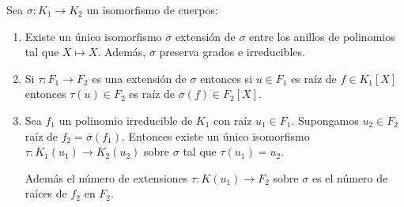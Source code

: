 \begin{proposition}\label{herramientas}
	Sea $\sigma:K_1 \to K_2$ un isomorfismo de cuerpos:
	
	\begin{enumerate}
		\item Existe un único isomorfismo $\overline{\sigma}$ extensión de $\sigma$ entre los anillos de polinomios tal que $X \mapsto X$. Además, $\overline{\sigma}$ preserva grados e irreducibles.  
		\item Si $\tau:F_1 \to F_2$ es una extensión de $\sigma$ entonces si $u \in F_1$ es raíz de $f \in K_1[X]$ entonces $\tau(u) \in F_2$ es raíz de $\overline{\sigma}(f) \in F_2[X]$. 	
		\item Sea $f_1$ un polinomio irreducible de $K_1$ con raíz $u_1 \in F_1$. Supongamos $u_2 \in F_2$ raíz de $f_2 = \overline{\sigma}(f_1)$. Entonces existe un único isomorfismo $\tau: K_1(u_1) \to K_2(u_2)$ sobre $\sigma$ tal que $\tau(u_1) = u_2$.
		
		Además el número de extensiones $\tau:K(u_1) \to F_2$ sobre $\sigma$ es el número de raíces de $f_2$ en $F_2$.
	
		
	\end{enumerate}
\end{proposition}
